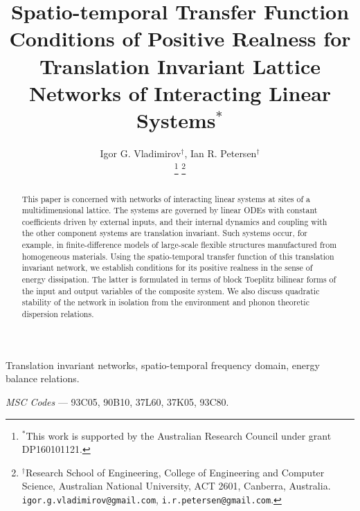 \documentclass[letterpaper, 10pt, conference]{ieeeconf}  %
\title{\LARGE \bf
Spatio-temporal Transfer Function Conditions of Positive Realness for Translation Invariant Lattice Networks of Interacting Linear
Systems$^*$}
\author{%
Igor G. Vladimirov$^{\dagger}$,
\qquad
Ian R. Petersen$^{\dagger}$\\%
\thanks{$^*$This work is supported by the Australian Research Council under grant DP160101121.}
\thanks{$^\dagger$Research School of Engineering, College of Engineering and Computer Science, Australian National University, ACT 2601, Canberra, Australia.
{\tt igor.g.vladimirov@gmail.com}, {\tt i.r.petersen@gmail.com}.
}
}
\begin{document}
\maketitle
\thispagestyle{empty}

\begin{abstract}
This paper is concerned with networks of interacting linear systems at sites of a multidimensional lattice. The systems are governed by linear ODEs with constant coefficients driven by external inputs, and their internal dynamics and coupling with the other component systems are translation invariant. Such systems occur, for example, in  finite-difference models of large-scale flexible structures manufactured from homogeneous materials. Using the spatio-temporal transfer function of this translation invariant network, we establish conditions for its positive realness in the sense of energy dissipation. The latter is formulated in terms of block Toeplitz bilinear forms of the input and output variables of the composite system. We also discuss quadratic stability of the network in isolation from the environment
and phonon theoretic dispersion relations.
%
\end{abstract}


\begin{keywords}
Translation invariant networks,
spatio-temporal frequency domain,
energy balance relations. %


\emph{MSC Codes} ---
93C05,   	%
90B10,   	%
37L60,      %
37K05,      %
93C80.   	%
\end{keywords}
\end{document}
